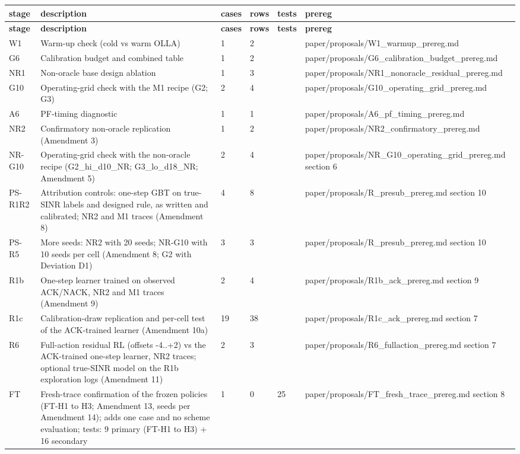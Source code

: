 \documentclass[10pt]{article}
\begin{document}
\begin{landscape}
\begin{longtable}{@{}llllll@{}}
\textbf{stage} & \textbf{description} & \textbf{cases} & \textbf{rows} & \textbf{tests} & \textbf{prereg} \\
\midrule
\endfirsthead
\toprule
\textbf{stage} & \textbf{description} & \textbf{cases} & \textbf{rows} & \textbf{tests} & \textbf{prereg} \\
\midrule
\endhead
W1 & Warm-up check (cold vs warm OLLA) & 1 & 2 &  & paper/proposals/W1\_warmup\_prereg.md \\
G6 & Calibration budget and combined table & 1 & 2 &  & paper/proposals/G6\_calibration\_budget\_prereg.md \\
NR1 & Non-oracle base design ablation & 1 & 3 &  & paper/proposals/NR1\_nonoracle\_residual\_prereg.md \\
G10 & Operating-grid check with the M1 recipe (G2; G3) & 2 & 4 &  & paper/proposals/G10\_operating\_grid\_prereg.md \\
A6 & PF-timing diagnostic & 1 & 1 &  & paper/proposals/A6\_pf\_timing\_prereg.md \\
NR2 & Confirmatory non-oracle replication (Amendment 3) & 1 & 2 &  & paper/proposals/NR2\_confirmatory\_prereg.md \\
NR-G10 & Operating-grid check with the non-oracle recipe (G2\_hi\_d10\_NR; G3\_lo\_d18\_NR; Amendment 5) & 2 & 4 &  & paper/proposals/NR\_G10\_operating\_grid\_prereg.md section 6 \\
PS-R1R2 & Attribution controls: one-step GBT on true-SINR labels and designed rule, as written and calibrated; NR2 and M1 traces (Amendment 8) & 4 & 8 &  & paper/proposals/R\_presub\_prereg.md section 10 \\
PS-R5 & More seeds: NR2 with 20 seeds; NR-G10 with 10 seeds per cell (Amendment 8; G2 with Deviation D1) & 3 & 3 &  & paper/proposals/R\_presub\_prereg.md section 10 \\
R1b & One-step learner trained on observed ACK/NACK, NR2 and M1 traces (Amendment 9) & 2 & 4 &  & paper/proposals/R1b\_ack\_prereg.md section 9 \\
R1c & Calibration-draw replication and per-cell test of the ACK-trained learner (Amendment 10a) & 19 & 38 &  & paper/proposals/R1c\_ack\_prereg.md section 7 \\
R6 & Full-action residual RL (offsets -4..+2) vs the ACK-trained one-step learner, NR2 traces; optional true-SINR model on the R1b exploration logs (Amendment 11) & 2 & 3 &  & paper/proposals/R6\_fullaction\_prereg.md section 7 \\
FT & Fresh-trace confirmation of the frozen policies (FT-H1 to H3; Amendment 13, seeds per Amendment 14); adds one case and no scheme evaluation; tests: 9 primary (FT-H1 to H3) + 16 secondary & 1 & 0 & 25 & paper/proposals/FT\_fresh\_trace\_prereg.md section 8 \\
\bottomrule
\end{longtable}
\normalsize

\end{landscape}
\end{document}
